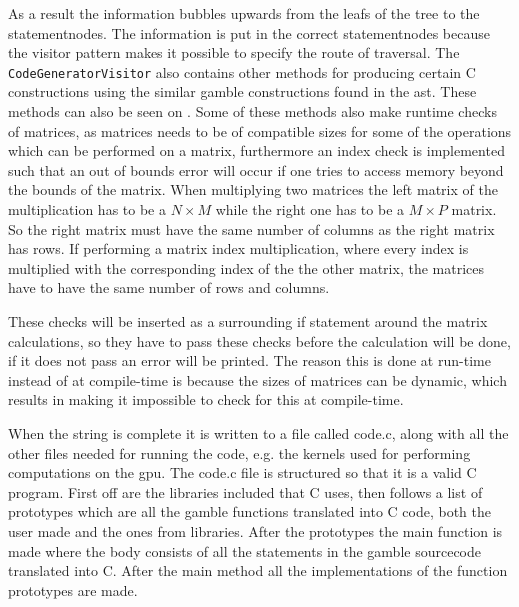 As a result the information bubbles upwards from the leafs of the tree to the statementnodes.
The information is put in the correct statementnodes because the visitor pattern makes it possible to specify the route of traversal.
The \texttt{CodeGeneratorVisitor} also contains other methods for producing certain C constructions using the similar \gls{gamble} constructions found in the \acrshort{ast}.
These methods can also be seen on .
Some of these methods also make runtime checks of matrices, as matrices needs to be of compatible sizes for some of the operations which can be performed on a matrix, furthermore an index check is implemented such that an out of bounds error will occur if one tries to access memory beyond the bounds of the matrix.
When multiplying two matrices the left matrix of the multiplication has to be a $ N \times M $ while the right one has to be a $ M \times P $ matrix.
So the right matrix must have the same number of columns as the right matrix has rows.
If performing a matrix index multiplication, where every index is multiplied with the corresponding index of the the other matrix, the matrices have to have the same number of rows and columns.

These checks will be inserted as a surrounding if statement around the matrix calculations, so they have to pass these checks before the calculation will be done, if it does not pass an error will be printed.
The reason this is done at run-time instead of at compile-time is because the sizes of matrices can be dynamic, which results in making it impossible to check for this at compile-time.

When the string is complete it is written to a file called code.c, along with all the other files needed for running the code, e.g. the kernels used for performing computations on the \acrshort{gpu}.
The code.c file is structured so that it is a valid C program.
First off are the libraries included that C uses, then follows a list of prototypes which are all the \gls{gamble} functions translated into C code, both the user made and the ones from libraries.
After the prototypes the main function is made where the body consists of all the statements in the \gls{gamble} sourcecode translated into C.
After the main method all the implementations of the function prototypes are made.